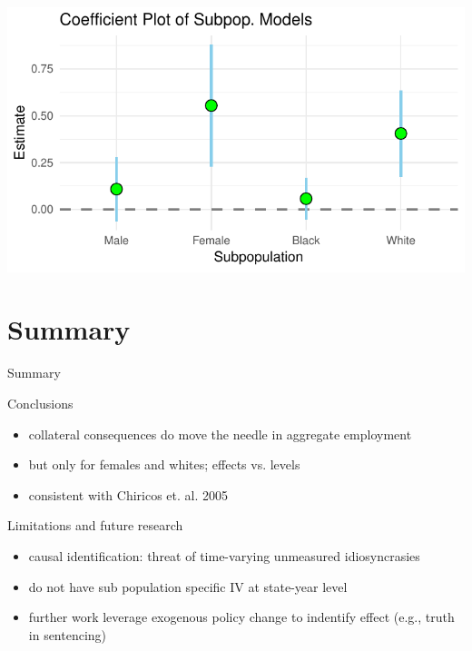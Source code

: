 \documentclass{beamer}\usepackage[]{graphicx}\usepackage[]{color}
\makeatletter
\def\maxwidth{ %
  \ifdim\Gin@nat@width>\linewidth
    \linewidth
  \else
    \Gin@nat@width
  \fi
}
\newenvironment{knitrout}{}{} %
\makeatother
\begin{document}
\begin{frame}



\begin{knitrout}
\color{fgcolor}
\includegraphics[width=\maxwidth]{figure/unnamed-chunk-11-1} 

\end{knitrout}
\end{frame}


\section{Summary}

\begin{frame}{Summary}
\begin{block}{Conclusions}
\begin{itemize}
\item collateral consequences do move the needle in aggregate employment
\item but only for females and whites; effects vs. levels
\item consistent with Chiricos et. al. 2005
\end{itemize}
\end{block}

\begin{block}{Limitations and future research}
\begin{itemize}
\item causal identification: threat of time-varying unmeasured idiosyncrasies
\item do not have sub population specific IV at state-year level
\item further work leverage exogenous policy change to indentify effect (e.g., truth in sentencing)
\end{itemize}
\end{block}
\end{frame}
\end{document}
